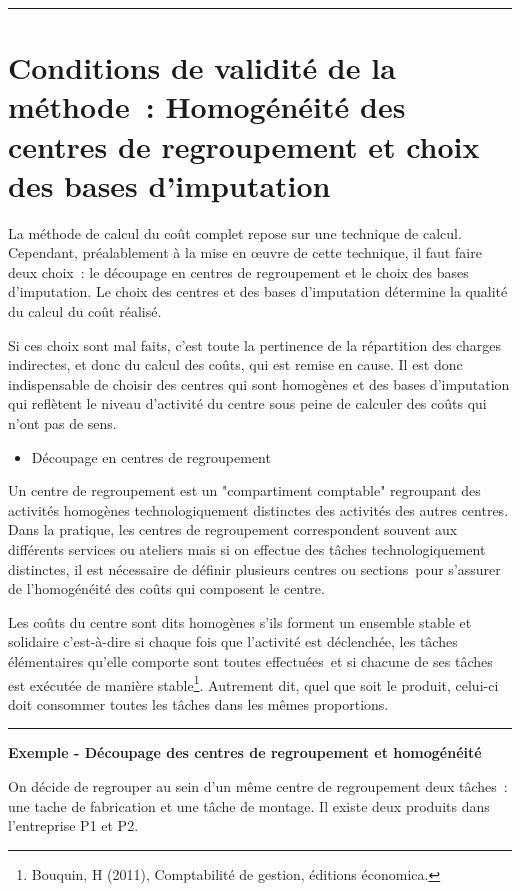 \documentclass[oneside]{kaobook}
\begin{document}
\noindent\rule{\textwidth}{0.5pt}

\section{Conditions de validité de la méthode : Homogénéité des centres de regroupement et choix des bases d'imputation}
\label{sec:org3b8fdde}
La méthode de calcul du coût complet repose sur une technique de calcul. Cependant, préalablement à la mise en œuvre de cette technique, il faut faire deux choix : le découpage en centres de regroupement et le choix des bases d'imputation. Le choix des centres et des bases d'imputation détermine la qualité du calcul du coût réalisé.

Si ces choix sont mal faits, c'est toute la pertinence de la répartition des charges indirectes, et donc du calcul des coûts, qui est remise en cause. Il est donc indispensable de choisir des centres qui sont homogènes et des bases d'imputation qui reflètent le niveau d'activité du centre sous peine de calculer des coûts qui n'ont pas de sens.

\begin{itemize}
\item Découpage en centres de regroupement
\end{itemize}

Un centre de regroupement est un "compartiment comptable" regroupant des activités homogènes technologiquement distinctes des activités des autres centres. Dans la pratique, les centres de regroupement correspondent souvent aux différents services ou ateliers mais si on effectue des tâches technologiquement distinctes, il est nécessaire de définir plusieurs centres ou sections pour s'assurer de l'homogénéité des coûts qui composent le centre.

Les coûts du centre sont dits homogènes s'ils forment un ensemble stable et solidaire c'est-à-dire si chaque fois que l'activité est déclenchée, les tâches élémentaires qu'elle comporte sont toutes effectuées et si chacune de ses tâches est exécutée de manière stable\footnote{Bouquin, H (2011), Comptabilité de gestion, éditions économica.}. Autrement dit, quel que soit le produit, celui-ci doit consommer toutes les tâches dans les mêmes proportions.

\noindent\rule{\textwidth}{0.5pt}
\textbf{Exemple - Découpage des centres de regroupement et homogénéité}

On décide de regrouper au sein d'un même centre de regroupement deux tâches : une tache de fabrication et une tâche de montage. Il existe deux produits dans l'entreprise P1 et P2.
\end{document}
